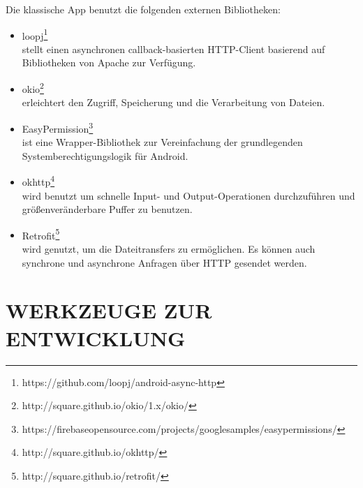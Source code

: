 \documentclass[a4paper,twoside]{article}
\begin{document}
	\noindent Die klassische App benutzt die folgenden externen Bibliotheken:
	\begin{itemize}
		\item loopj\footnote{https://github.com/loopj/android-async-http}\\
		stellt einen asynchronen callback-basierten HTTP-Client basierend auf Bibliotheken von Apache zur Verf\"ugung.
		\item okio\footnote{http://square.github.io/okio/1.x/okio/}\\
		erleichtert den Zugriff, Speicherung und die Verarbeitung von Dateien.
		\item EasyPermission\footnote{https://firebaseopensource.com/projects/googlesamples/easypermissions/} \\
		ist eine Wrapper-Bibliothek zur Vereinfachung der grundlegenden Systemberechtigungslogik für Android.
		\item okhttp\footnote{http://square.github.io/okhttp/} \\
		wird benutzt um schnelle Input- und Output-Operationen durchzuf\"uhren und gr\"o\ss{}enver\"anderbare Puffer zu benutzen.
		\item Retrofit\footnote{http://square.github.io/retrofit/} \\
		wird genutzt, um die Dateitransfers zu erm\"oglichen. Es k\"onnen auch synchrone und asynchrone Anfragen \"uber HTTP gesendet werden.
	\end{itemize}
	
	\section{\uppercase{Werkzeuge zur Entwicklung}}
	
\end{document}
